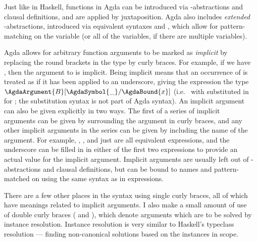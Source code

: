 Just like in Haskell, functions in Agda can be introduced via
\AgdaSymbol{$\uplambda$}-abstractions and clausal definitions, and are applied
by juxtaposition.
Agda also includes \emph{extended} \AgdaSymbol{$\uplambda$}-abstractions,
introduced via equivalent syntaxes
\AgdaSymbol{$\uplambda$}\AgdaSpace{}\AgdaSpace{}%
\AgdaSpace{}\AgdaSymbol{$\to$}\AgdaSpace{} and
\AgdaSymbol{$\uplambda$}\AgdaSpace{}\AgdaSymbol{\{}\AgdaSpace{}%
\AgdaSpace{}\AgdaSymbol{$\to$}\AgdaSpace{}%
\AgdaSpace{}\AgdaSymbol{\}},
which allow for pattern-matching on the variable  (or all of the
variables, if there are multiple variables).

Agda allows for arbitrary function arguments to be marked as \emph{implicit} by
replacing the round brackets in the type by curly braces.
For example, if we have
\AgdaSpace{}\AgdaSymbol{:}\AgdaSpace{}%
\AgdaSymbol{\{}\AgdaSpace{}\AgdaSymbol{:}\AgdaSpace{}%
\AgdaSymbol{\}}\AgdaSpace{}\AgdaSymbol{$\to$}\AgdaSpace{}%
,
then the argument to  is implicit.
Being implicit means that an occurrence of  is treated as if it has
been applied to an underscore, giving the expression  the type
$\AgdaArgument{B}[\AgdaSymbol{\_}/\AgdaBound{x}]$ (i.e.\  with
\AgdaSymbol{\_} substituted in for ; the substitution syntax is not
part of Agda syntax).
An implicit argument can also be given explicitly in two ways.
The first of a series of implicit arguments can be given by surrounding the
argument in curly braces, and any other implicit arguments in the series can be
given by including the name of the argument.
For example,
\AgdaSpace{}\AgdaSymbol{\{}\AgdaSymbol{\_}\AgdaSymbol{\}},
\AgdaSpace{}\AgdaSymbol{\{}\AgdaSpace{}%
\AgdaSymbol{=}\AgdaSpace{}\AgdaSymbol{\_}\AgdaSymbol{\}}, and just
 are all equivalent expressions, and the underscore can be filled
in in either of the first two expressions to provide an actual value for the
implicit argument.
Implicit arguments are usually left out of \AgdaSymbol{$\uplambda$}-abstractions
and clausal definitions, but can be bound to names and pattern-matched on using
the same syntax as in expressions.

There are a few other places in the syntax using single curly braces, all of
which have meanings related to implicit arguments.
I also make a small amount of use of double curly braces
(\AgdaSymbol{\{\{} and \AgdaSymbol{\}\}}), which denote arguments which are to
be solved by instance resolution.
Instance resolution is very similar to Haskell's typeclass resolution ---
finding non-canonical solutions based on the instances in scope.

